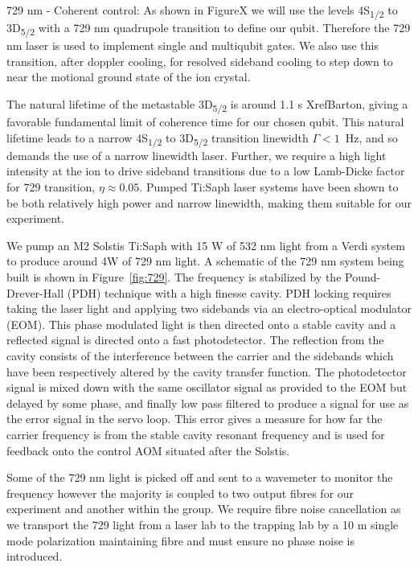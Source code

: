 \documentclass[12pt]{iopart}
\begin{document}
729 nm - Coherent control: As shown in FigureX we will use the levels
4S\textsubscript{1/2} to 3D\textsubscript{5/2} with a 729 nm
quadrupole transition to define our qubit. Therefore the 729 nm laser
is used to implement single and multiqubit gates. We also use this
transition, after doppler cooling, for resolved sideband cooling to
step down to near the motional ground state of the ion crystal.

The natural lifetime of the metastable
3D\textsubscript{5/2} is around 1.1 s XrefBarton, giving a favorable
fundamental limit of coherence time for our chosen qubit.
This natural lifetime leads to a narrow 4S\textsubscript{1/2} to
3D\textsubscript{5/2} transition linewidth $\Gamma < 1$~Hz, and so
demands the use of a narrow linewidth laser. Further, we require a
high light intensity at the ion to drive sideband transitions due to a low
Lamb-Dicke factor for 729 transition, $\eta \approx 0.05$.
Pumped Ti:Saph laser systems have been shown to be both relatively
high power and narrow linewidth, making them suitable for our
experiment.

We pump an M2 Solstis Ti:Saph with 15 W of 532 nm light from a Verdi
system to produce around 4W of 729 nm light.  A schematic of the 729
nm system being built is shown in Figure~\ref{fig:729}. The frequency is
stabilized by the Pound-Drever-Hall (PDH) technique with a high
finesse cavity. PDH locking requires taking the laser light and
applying two sidebands via an electro-optical modulator (EOM). This
phase modulated light is then directed onto a stable cavity and a
reflected signal is directed onto a fast photodetector. The reflection
from the cavity consists of the interference between the carrier and
the sidebands which have been respectively altered by the cavity
transfer function. The photodetector signal is mixed down with the
same oscillator signal as provided to the EOM but delayed by some
phase, and finally low pass filtered to produce a signal for use as
the error signal in the servo loop.  This error gives a measure for
how far the carrier frequency is from the stable cavity resonant
frequency and is used for feedback onto the control AOM situated after
the Solstis.

Some of the 729 nm light is picked off and sent to a wavemeter to
monitor the frequency however the majority is coupled to two output
fibres for our experiment and another within the group. We require
fibre noise cancellation as we transport the 729 light from a laser
lab to the trapping lab by a 10 m single mode polarization maintaining
fibre and must ensure no phase noise is introduced.
\end{document}
